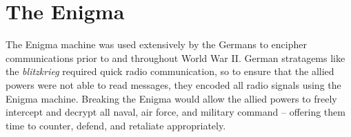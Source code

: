 \chapter{The Enigma}

The Enigma machine was used extensively by the Germans to encipher
communications prior to and throughout World War II. German
stratagems like the \emph{blitzkrieg} required quick radio
communication, so to ensure that the allied powers were not able to read
messages, they encoded all radio signals using the Enigma machine.
Breaking the Enigma would allow the allied powers to freely intercept
and decrypt
all naval, air force, and military command -- offering them time to
counter, defend, and retaliate appropriately.
